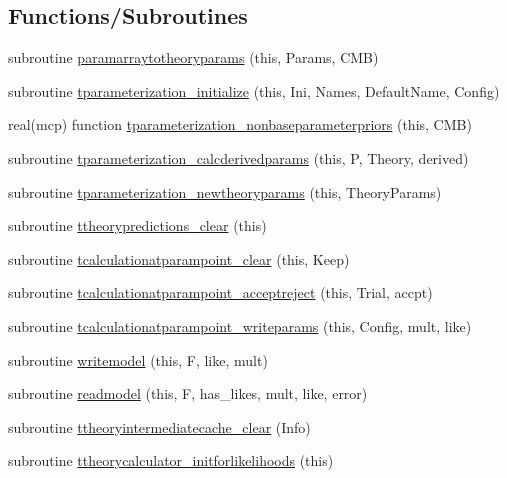 \subsection*{Functions/\+Subroutines}
\begin{DoxyCompactItemize}
\item 
subroutine \mbox{\hyperlink{namespacegeneraltypes_a416bb37c1c9b61ae49640747ff4b7630}{paramarraytotheoryparams}} (this, Params, C\+MB)
\item 
subroutine \mbox{\hyperlink{namespacegeneraltypes_a3ebde3fdac358126f25e067d6b223de1}{tparameterization\+\_\+initialize}} (this, Ini, Names, Default\+Name, Config)
\item 
real(mcp) function \mbox{\hyperlink{namespacegeneraltypes_ad583eb4db9430c5b495f21cc9863017d}{tparameterization\+\_\+nonbaseparameterpriors}} (this, C\+MB)
\item 
subroutine \mbox{\hyperlink{namespacegeneraltypes_afd268eae09678643a72d0b3ed8da568a}{tparameterization\+\_\+calcderivedparams}} (this, P, Theory, derived)
\item 
subroutine \mbox{\hyperlink{namespacegeneraltypes_a21288f1eff4120ed86e9b0bfce3eed50}{tparameterization\+\_\+newtheoryparams}} (this, Theory\+Params)
\item 
subroutine \mbox{\hyperlink{namespacegeneraltypes_a445b06716a45b37bc3100a23b2742d2e}{ttheorypredictions\+\_\+clear}} (this)
\item 
subroutine \mbox{\hyperlink{namespacegeneraltypes_ace116f1d7f9e8a3fdff59a6c376273e3}{tcalculationatparampoint\+\_\+clear}} (this, Keep)
\item 
subroutine \mbox{\hyperlink{namespacegeneraltypes_a4807ce873100fa001203158f5ed66fbd}{tcalculationatparampoint\+\_\+acceptreject}} (this, Trial, accpt)
\item 
subroutine \mbox{\hyperlink{namespacegeneraltypes_a2a8909b75d213ee335199e2fd1769711}{tcalculationatparampoint\+\_\+writeparams}} (this, Config, mult, like)
\item 
subroutine \mbox{\hyperlink{namespacegeneraltypes_a6ae308a4d8fb255fd1e15dc6a8911931}{writemodel}} (this, F, like, mult)
\item 
subroutine \mbox{\hyperlink{namespacegeneraltypes_a9fdd457b58418041f9a4639dd76570db}{readmodel}} (this, F, has\+\_\+likes, mult, like, error)
\item 
subroutine \mbox{\hyperlink{namespacegeneraltypes_a890f7aa63579a54ec8ca5a3a8d19a607}{ttheoryintermediatecache\+\_\+clear}} (Info)
\item 
subroutine \mbox{\hyperlink{namespacegeneraltypes_aa79e01f130bcebe63ffce5dffb17950c}{ttheorycalculator\+\_\+initforlikelihoods}} (this)

\end{DoxyCompactItemize}
